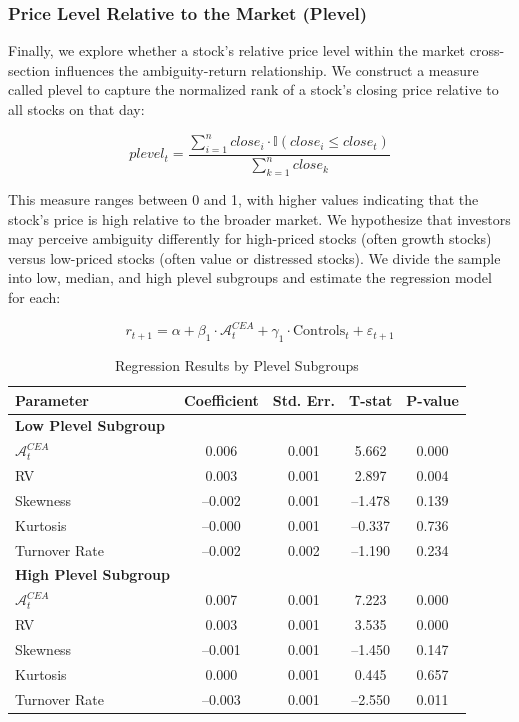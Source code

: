 \documentclass[preprint,12pt,authoryear]{elsarticle}
\begin{document}
\subsubsection{Price Level Relative to the Market (Plevel)} \label{subsec:price_level}

Finally, we explore whether a stock's relative price level within the market cross-section influences the ambiguity-return relationship. We construct a measure called plevel to capture the normalized rank of a stock's closing price relative to all stocks on that day:

\begin{equation}
plevel_t = \frac{\sum_{i=1}^n close_i \cdot \mathbb{I}(close_i \leq close_t)}{\sum_{k=1}^n close_k}
\end{equation}

This measure ranges between 0 and 1, with higher values indicating that the stock's price is high relative to the broader market. We hypothesize that investors may perceive ambiguity differently for high-priced stocks (often growth stocks) versus low-priced stocks (often value or distressed stocks). We divide the sample into low, median, and high plevel subgroups and estimate the regression model for each:

\begin{equation}
r_{t+1} = \alpha + \beta_1 \cdot \mathcal{A}^{CEA}_t + \gamma_1 \cdot \mathrm{Controls}_t + \varepsilon_{t+1}
\end{equation}

\begin{table}[h!]
\centering
\caption{Regression Results by Plevel Subgroups}
\label{tab:plevel_subgroup_results}
\begin{tabularx}{\textwidth}{Xcccc}
\toprule
\textbf{Parameter} & \textbf{Coefficient} & \textbf{Std. Err.} & \textbf{T-stat} & \textbf{P-value} \\
\midrule
\textbf{Low Plevel Subgroup} & & & & \\
\(\mathcal{A}^{CEA}_t\) & 0.006 & 0.001 & 5.662 & 0.000 \\
RV & 0.003 & 0.001 & 2.897 & 0.004 \\
Skewness & –0.002 & 0.001 & –1.478 & 0.139 \\
Kurtosis & –0.000 & 0.001 & –0.337 & 0.736 \\
Turnover Rate & –0.002 & 0.002 & –1.190 & 0.234 \\
\midrule
\textbf{High Plevel Subgroup} & & & & \\
\(\mathcal{A}^{CEA}_t\) & 0.007 & 0.001 & 7.223 & 0.000 \\
RV & 0.003 & 0.001 & 3.535 & 0.000 \\
Skewness & –0.001 & 0.001 & –1.450 & 0.147 \\
Kurtosis & 0.000 & 0.001 & 0.445 & 0.657 \\
Turnover Rate & –0.003 & 0.001 & –2.550 & 0.011 \\
\bottomrule
\end{tabularx}
\end{table}
\end{document}
